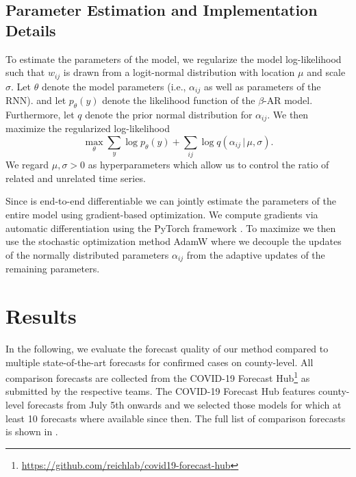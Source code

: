 \documentclass{article}
\newcommand{\bAR}{\ensuremath{\beta}\text{-AR}\xspace}
\begin{document}
\subsection{Parameter Estimation and Implementation Details}
\label{sec:org751d6db}
To estimate the parameters of the model, we regularize the
model log-likelihood such that \(w_{ij}\) is drawn from a logit-normal
distribution with location \(\mu\) and scale \(\sigma\). Let \(\theta\) denote
the model parameters (i.e., \(\alpha_{ij}\) as well as parameters of the RNN).
and let \(p_\theta(y)\) denote the likelihood function of the \(\bAR\)
model. Furthermore, let \(q\) denote the prior normal
distribution for \(\alpha_{ij}\). We then maximize the regularized log-likelihood
\begin{equation}
\max_{\theta}\sum_y\log p_\theta(y) + \sum_{ij} \log q(\alpha_{ij}\,|\,\mu,\sigma). \label{eq:objective}
\end{equation}
We regard \(\mu, \sigma > 0\) as hyperparameters which allow us to control the
ratio of related and unrelated time series.

Since  is end-to-end differentiable we can jointly estimate the
parameters of the entire model using gradient-based optimization. We compute
gradients via automatic differentiation using the PyTorch framework
\citep{paszke2019pytorch}. To maximize  we then use the stochastic
optimization method AdamW \citep{loshchilov2018decoupled} where we decouple the
updates of the normally distributed parameters \(\alpha_{ij}\) from the adaptive
updates of the remaining parameters.

\section{Results}
\label{sec:org99c3fc8}
In the following, we evaluate the forecast quality of our method compared to
multiple state-of-the-art forecasts for confirmed cases on
county-level. All comparison forecasts are collected from the COVID-19 Forecast
Hub\footnote{\url{https://github.com/reichlab/covid19-forecast-hub}} as submitted by
the respective teams. The COVID-19 Forecast Hub features county-level forecasts
from July 5th onwards and we selected those models for which at least 10 forecasts
where available since then. The full list of comparison forecasts is shown in
.
\end{document}
